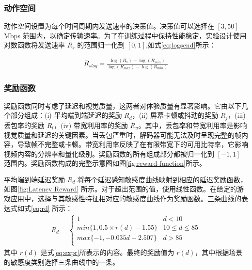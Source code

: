 \subsubsection{动作空间}
动作空间设置为每个时间周期内发送速率的决策值。决策值可以选择在 $[3, 50]$ Mbps 范围内，以确定传输速率。为了在训练过程中保持性能稳定，实验设计使用对数函数将发送速率 $R_s$ 的范围归一化到 $[0, 1]$,如式\eqref{eq:logsend}所示：

\begin{equation}
\begin{aligned}
    R_{slog} = \frac{\log(R_s)-\log(R_{min})}{\log(R_{max})-\log(R_{min})}
\end{aligned}
\label{eq:logsend}
\end{equation} 

\subsubsection{奖励函数}
奖励函数同时考虑了延迟和视觉质量，这两者对体验质量有显著影响。它由以下几个部分组成：(i) 平均端到端延迟的奖励 $R_d$，(ii) 屏幕卡顿或抖动的奖励 $R_j$，(iii) 丢包率的奖励 $R_l$，(iv) 带宽利用率的奖励 $R_u$。其中，丢包率和带宽利用率是影响视觉质量和延迟的关键因素。当丢包严重时，解码器可能无法及时呈现完整的帧内容，导致帧不完整或卡顿。带宽利用率反映了在有限带宽下的可用比特率，它影响视频内容的分辨率和量化级别。奖励函数的所有组成部分都被归一化到 $[-1, 1]$ 范围内。奖励函数构成的完整示意图如图\ref{fig:reward-function}所示。






平均端到端延迟奖励 $R_d$ 将每个延迟感知敏感度曲线映射到相应的延迟奖励函数，如图\ref{fig:Latency Reward} 所示。对于超出范围的值，使用线性函数。在给定的游戏应用中，选择与其敏感性特征相对应的敏感度曲线作为奖励函数。三条曲线的表达式如式\eqref{eq:rd} 所示：
\begin{equation}
\begin{aligned}
R_{d} = 
    \begin{cases}
        1 & d < 10\\
        min\{1,0.5 \times r(d) - 1.55 \}& 10 \leq d \leq 85 \\
        max\{-1,- 0.035d +2.507\} & d > 85\\
\end{cases}
\end{aligned}
\label{eq:rd}
\end{equation}
其中 $r(d)$ 是式\eqref{eq:expr}所表示的内容。最终的奖励值为 $r(d)$，其中根据场景的敏感度类别选择三条曲线中的一条。

